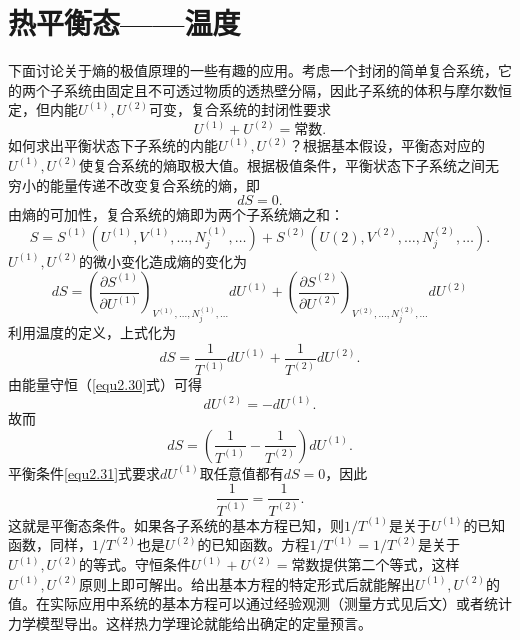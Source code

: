 \section{热平衡态——温度}
\label{sec2.4}
下面讨论关于熵的极值原理的一些有趣的应用。考虑一个封闭的简单复合系统，它的两个子系统由固定且不可透过物质的透热壁分隔，因此子系统的体积与摩尔数恒定，但内能$U^{(1)}, U^{(2)}$可变，复合系统的封闭性要求
\begin{equation}
\label{equ2.30}
	U^{(1)} + U^{(2)} = \text{常数}.
\end{equation}
如何求出平衡状态下子系统的内能$U^{(1)}, U^{(2)}$？根据基本假设，平衡态对应的$U^{(1)}, U^{(2)}$使复合系统的熵取极大值。根据极值条件，平衡状态下子系统之间无穷小的能量传递不改变复合系统的熵，即
\begin{equation}
\label{equ2.31}
	dS = 0.
\end{equation}
由熵的可加性，复合系统的熵即为两个子系统熵之和：
\begin{equation}
\label{equ2.32}
	S = S^{(1)} (U^{(1)}, V^{(1)}, \dots, N_j^{(1)}, \dots) + S^{(2)} (U{(2)}, V^{(2)}, \dots, N_j^{(2)}, \dots).
\end{equation}
$U^{(1)}, U^{(2)}$的微小变化造成熵的变化为
\begin{equation}
\label{equ2.33}
	dS = \left( \frac{\partial S^{(1)} }{\partial U^{(1)} } \right)_{V^{(1)}, \dots, N_j^{(1)}, \dots} dU^{(1)} + \left( \frac{\partial S^{(2)} }{\partial U^{(2)} } \right)_{V^{(2)}, \dots, N_j^{(2)}, \dots} dU^{(2)}
\end{equation}
利用温度的定义，上式化为
\begin{equation}
\label{equ2.34}
	dS = \frac{1}{T^{(1)}} dU^{(1)} + \frac{1}{T^{(2)}} dU^{(2)}.
\end{equation}
由能量守恒（\eqref{equ2.30}式）可得
\begin{equation}
\label{equ2.35}
	dU^{(2)} = -dU^{(1)}.
\end{equation}
故而
\begin{equation}
\label{equ2.36}
	dS = \left( \frac{1}{T^{(1)}} - \frac{1}{T^{(2)}} \right) dU^{(1)}.
\end{equation}
平衡条件\eqref{equ2.31}式要求$dU^{(1)}$取任意值都有$dS = 0$，因此
\begin{equation}
\label{equ2.37}
	\frac{1}{T^{(1)}} = \frac{1}{T^{(2)}}.
\end{equation}
这就是平衡态条件。如果各子系统的基本方程已知，则$1 / T^{(1)}$是关于$U^{(1)}$的已知函数，同样，$1 / T^{(2)}$也是$U^{(2)}$的已知函数。方程$1 / T^{(1)} = 1 / T^{(2)}$是关于$U^{(1)}, U^{(2)}$的等式。守恒条件$U^{(1)} + U^{(2)} = \text{常数}$提供第二个等式，这样$U^{(1)}, U^{(2)}$原则上即可解出。给出基本方程的特定形式后就能解出$U^{(1)}, U^{(2)}$的值。在实际应用中系统的基本方程可以通过经验观测（测量方式见后文）或者统计力学模型导出。这样热力学理论就能给出确定的定量预言。

